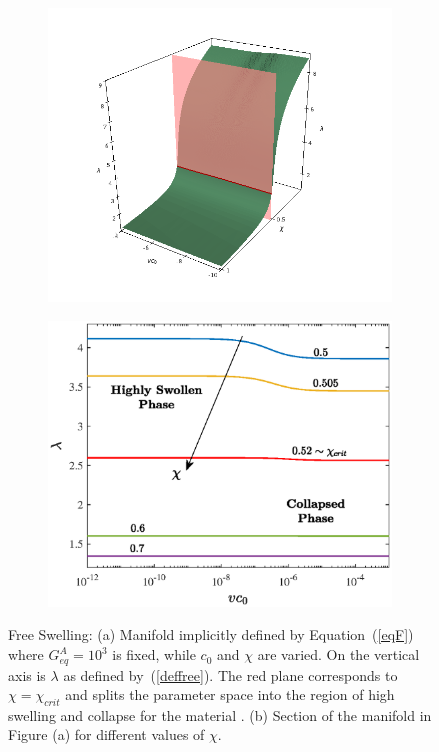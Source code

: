 \documentclass[runningheads]{llncs}
\begin{document}
\begin{figure}[h!]
	\begin{subfigure}{0.53\textwidth}
		\includegraphics[scale=0.25]{images/manifold}
		\caption{}
	\end{subfigure}
	\hspace{-5mm}
	\begin{subfigure}{0.46\textwidth}
		\hspace{-3mm}
		\includegraphics[scale=0.4]{images/free1}
		\caption{}
	\end{subfigure}
	\caption{Free Swelling: (a) Manifold implicitly defined by Equation~(\ref{eqF}) where $G^A_{eq}=10^3$ is fixed, while $c_0$ and $\chi$ are varied. On the vertical axis is $\lambda$ as defined by~(\ref{deffree}). The red plane corresponds to $\chi=\chi_{crit}$ and splits the parameter space into the region of high swelling and collapse for the material \cite{swell2}. (b) Section of the manifold in Figure (a) for different values of $\chi$.}
	\label{analysis}
	\vspace{2mm}
\end{figure}
\end{document}
